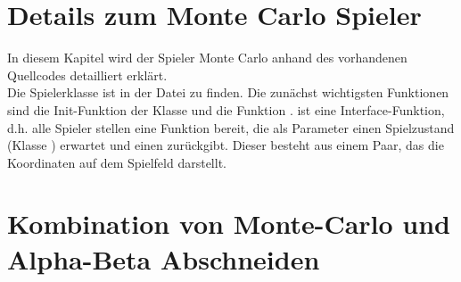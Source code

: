 \section{Details zum Monte Carlo Spieler}
In diesem Kapitel wird der Spieler Monte Carlo anhand des vorhandenen Quellcodes detailliert erklärt.
\\Die Spielerklasse  ist in der Datei  zu finden.
Die zunächst wichtigsten Funktionen sind die Init-Funktion der Klasse und die Funktion .  ist eine Interface-Funktion, d.h. alle Spieler stellen eine Funktion  bereit, die als Parameter einen Spielzustand (Klasse ) erwartet und einen  zurückgibt. Dieser besteht aus einem Paar, das die Koordinaten auf dem Spielfeld darstellt.

\section{Kombination von Monte-Carlo und Alpha-Beta Abschneiden}
\label{ab_comb}